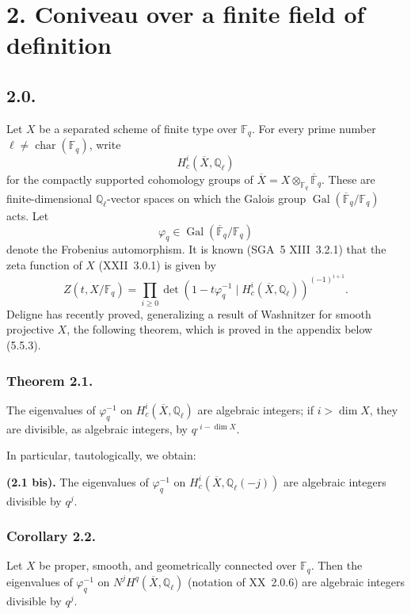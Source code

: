 \section*{2. Coniveau over a finite field of definition}

\subsection*{2.0.}
Let $X$ be a separated scheme of finite type over $\mathbb F_q$.  For every
prime number $\ell\ne\operatorname{char}(\mathbb F_q)$, write
\begin{equation}\tag{2.0.1}
H_c^i(\overline X,\mathbb Q_\ell)
\end{equation}
for the compactly supported cohomology groups of
$\overline X=X\otimes_{\mathbb F_q}\overline{\mathbb F}_q$.  These are
finite-dimensional $\mathbb Q_\ell$-vector spaces on which the Galois group
$\operatorname{Gal}(\overline{\mathbb F}_q/\mathbb F_q)$ acts.  Let
\begin{equation}\tag{2.0.2}
\varphi_q\in\operatorname{Gal}(\overline{\mathbb F}_q/\mathbb F_q)
\end{equation}
denote the Frobenius automorphism.  It is known (SGA~5 XIII~3.2.1) that the
zeta function of $X$ (XXII~3.0.1) is given by
\begin{equation}\tag{2.0.3}
Z(t,X/\mathbb F_q)=
\prod_{i\geq0}
\det\!\left(1-t\varphi_q^{-1}\mid
H_c^i(\overline X,\mathbb Q_\ell)\right)^{(-1)^{i+1}}.
\end{equation}
Deligne has recently proved, generalizing a result of Washnitzer for smooth
projective $X$, the following theorem, which is proved in the appendix below
(5.5.3).

\subsubsection*{Theorem 2.1.}
The eigenvalues of $\varphi_q^{-1}$ on
$H_c^i(\overline X,\mathbb Q_\ell)$ are algebraic integers; if
$i>\dim X$, they are divisible, as algebraic integers, by
$q^{,i-\dim X}$.

In particular, tautologically, we obtain:

\medskip
\noindent\textbf{(2.1 bis).}
The eigenvalues of $\varphi_q^{-1}$ on
$H_c^i(\overline X,\mathbb Q_\ell(-j))$ are algebraic integers divisible by
$q^j$.

\subsubsection*{Corollary 2.2.}
Let $X$ be proper, smooth, and geometrically connected over $\mathbb F_q$.
Then the eigenvalues of $\varphi_q^{-1}$ on
$N^jH^q(\overline X,\mathbb Q_\ell)$ (notation of XX~2.0.6) are algebraic
integers divisible by $q^j$.

